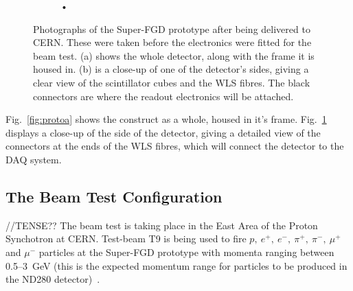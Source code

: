 \documentclass[aps,pra,12pt,notitlepage,tightenlines]{revtex4-1}
\begin{document}
\begin{figure}
\begin{subfigure}{.5\textwidth}
   \caption{•}
   \label{fig:protob}
  \end{subfigure}
  \caption{Photographs of the Super-FGD prototype after being delivered to CERN. These were taken before the electronics were fitted for the beam test. (a) shows the whole detector, along with the frame it is housed in. (b) is a close-up of one of the detector's sides, giving a clear view of the scintillator cubes and the WLS fibres. The black connectors are where the readout electronics will be attached.}
  \label{fig:proto}
 \end{figure}
Fig.\ \ref{fig:protoa} shows the construct as a whole, housed in it's frame. Fig.\ \ref{fig:protob} displays a close-up of the side of the detector, giving a detailed view of the connectors at the ends of the WLS fibres, which will connect the detector to the DAQ system.

\subsection{The Beam Test Configuration} //TENSE??
The beam test is taking place in the East Area of the Proton Synchotron at CERN. Test-beam T9 is being used to fire $p, \ e^+, \ e^-, \ \pi^+, \ \pi^-, \ \mu^+$ and $\mu^-$ particles at the Super-FGD prototype with momenta ranging between 0.5--3~GeV (this is the expected momentum range for particles to be produced in the ND280 detector)~\cite{Durieu2001}. 
\end{document}

